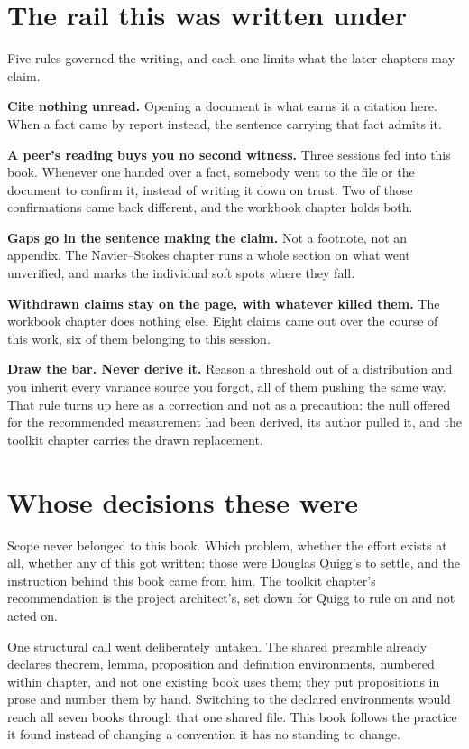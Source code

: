 \section{The rail this was written under}

Five rules governed the writing, and each one limits what the later chapters may claim.

\textbf{Cite nothing unread.} Opening a document is what earns it a citation here. When a fact came
by report instead, the sentence carrying that fact admits it.

\textbf{A peer's reading buys you no second witness.} Three sessions fed into this book. Whenever
one handed over a fact, somebody went to the file or the document to confirm it, instead of writing
it down on trust. Two of those confirmations came back different, and the workbook chapter holds both.

\textbf{Gaps go in the sentence making the claim.} Not a footnote, not an appendix. The
Navier--Stokes chapter runs a whole section on what went unverified, and marks the individual soft
spots where they fall.

\textbf{Withdrawn claims stay on the page, with whatever killed them.} The workbook chapter does
nothing else. Eight claims came out over the course of this work, six of them belonging to this
session.

\textbf{Draw the bar. Never derive it.} Reason a threshold out of a distribution and you inherit
every variance source you forgot, all of them pushing the same way. That rule turns up here as a
correction and not as a precaution: the null offered for the recommended measurement had been
derived, its author pulled it, and the toolkit chapter carries the drawn replacement.

\section{Whose decisions these were}

Scope never belonged to this book. Which problem, whether the effort exists at all, whether any of
this got written: those were Douglas Quigg's to settle, and the instruction behind this book came
from him. The toolkit chapter's recommendation is the project architect's, set down for Quigg to
rule on and not acted on.

One structural call went deliberately untaken. The shared preamble already declares theorem, lemma,
proposition and definition environments, numbered within chapter, and not one existing book uses
them; they put propositions in prose and number them by hand. Switching to the declared environments
would reach all seven books through that one shared file. This book follows the practice it found
instead of changing a convention it has no standing to change.
